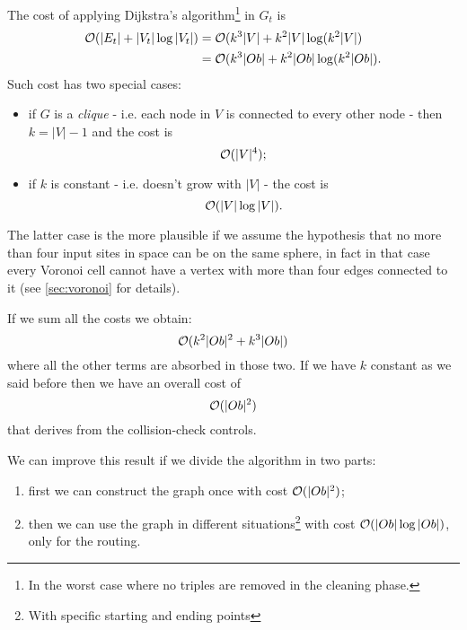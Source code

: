 \documentclass[dissertation.tex]{subfiles}
\begin{document}
The cost of applying Dijkstra's algorithm\footnote{In the worst case
  where no triples are removed in the cleaning phase.} in $G_t$ is \cite{bondy}\cite{lavalle}
\newcommand{\eqCostDijkstraTriples}{\ensuremath{\bigO(k^3|Ob|+k^2|Ob|\log(k^2|Ob|)}}
\begin{equation}
  \label{eq:costDijkstraTriples}
  \begin{split}
    \bigO(|E_t|+|V_t|\log |V_t|) &= \bigO(k^3|V|+k^2|V|\log(k^2|V|)\\
    &= \eqCostDijkstraTriples.
  \end{split}
\end{equation}
Such cost has two special cases:
\begin{itemize}
\item if $G$ is a \emph{clique} - i.e. each
  node in $V$ is connected to every other node \cite{bondy} - then
  $k=|V|-1$ and the cost is
  \begin{equation*}
    \mathcal{O}(|V|^4);
  \end{equation*}
\item if $k$ is constant - i.e. doesn't grow with $|V|$ - the
  cost is
  \begin{equation*}
    \mathcal{O}(|V|\log|V|).
  \end{equation*}
\end{itemize}
The latter case is the more plausible if we assume the hypothesis that
no more than four input sites in space can be on the
same sphere, in fact in that case
every Voronoi cell cannot have a vertex with more than four edges
connected to it (see \cref{sec:voronoi} for details).

If we sum all the costs we obtain:
\newcommand{\eqCostTotalOne}{\ensuremath{\bigO(k^2|Ob|^2+k^3|Ob|)}}
\begin{equation}\label{eq:costTotalOne}
  \eqCostTotalOne
\end{equation}
where all the other terms are absorbed in those two. If we have $k$
constant as we said before then we have an overall cost of
\newcommand{\eqCostTotalOneK}{\ensuremath{\bigO(|Ob|^2)}}
\begin{equation}\label{eq:costTotalOneK}
  \eqCostTotalOneK
\end{equation}
that derives from the collision-check controls.

We can improve
this result if we divide the algorithm in two parts:
\begin{enumerate}
\item first we 
  can construct the graph once with cost $\mathcal{O}(|Ob|^2)$;
\item then we can
  use the graph in different situations\footnote{With specific starting
    and ending points} with cost $\mathcal{O}(|Ob|\log |Ob|)$, only for the
  routing.
\end{enumerate}
\end{document}
